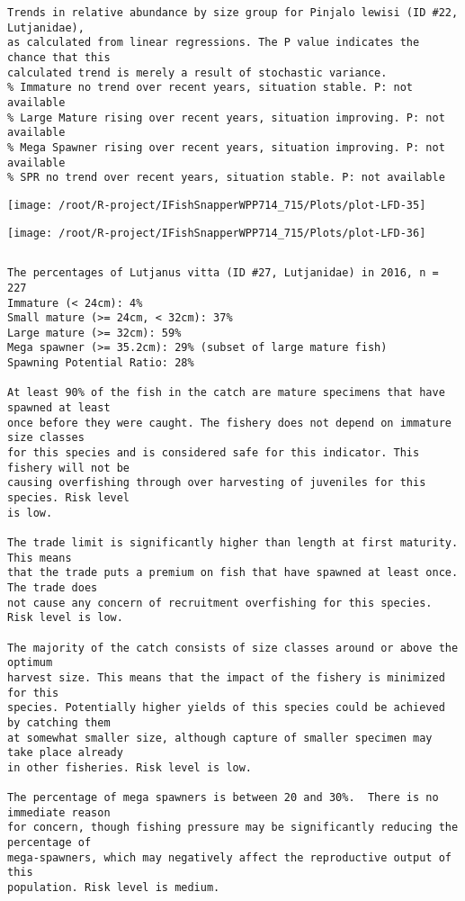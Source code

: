 \documentclass{report}\usepackage[]{graphicx}\usepackage[]{color}
\makeatletter
\def\maxwidth{ %
  \ifdim\Gin@nat@width>\linewidth
    \linewidth
  \else
    \Gin@nat@width
  \fi
}
\newenvironment{kframe}{%
 \def\at@end@of@kframe{}%
 \ifinner\ifhmode%
  \def\at@end@of@kframe{\end{minipage}}%
  \begin{minipage}{\columnwidth}%
 \fi\fi%
 \def\FrameCommand##1{\hskip\@totalleftmargin \hskip-\fboxsep
 \colorbox{shadecolor}{##1}\hskip-\fboxsep
     \hskip-\linewidth \hskip-\@totalleftmargin \hskip\columnwidth}%
 \MakeFramed {\advance\hsize-\width
   \@totalleftmargin\z@ \linewidth\hsize
   \@setminipage}}%
 {\par\unskip\endMakeFramed%
 \at@end@of@kframe}
\newenvironment{knitrout}{}{} %
\makeatother
\begin{document}
\begin{knitrout}
\begin{kframe}
\begin{verbatim}
Trends in relative abundance by size group for Pinjalo lewisi (ID #22, Lutjanidae),
as calculated from linear regressions. The P value indicates the chance that this
calculated trend is merely a result of stochastic variance.
% Immature no trend over recent years, situation stable. P: not available
% Large Mature rising over recent years, situation improving. P: not available
% Mega Spawner rising over recent years, situation improving. P: not available
% SPR no trend over recent years, situation stable. P: not available
\end{verbatim}
\end{kframe}
\texttt{[image: /root/R-project/IFishSnapperWPP714\_715/Plots/plot-LFD-35]} 

\texttt{[image: /root/R-project/IFishSnapperWPP714\_715/Plots/plot-LFD-36]} 
\begin{kframe}\begin{verbatim}
\end{verbatim}
\end{kframe}
\clearpage
\newpage
\begin{kframe}\begin{verbatim}The percentages of Lutjanus vitta (ID #27, Lutjanidae) in 2016, n = 227
Immature (< 24cm): 4%
Small mature (>= 24cm, < 32cm): 37%
Large mature (>= 32cm): 59%
Mega spawner (>= 35.2cm): 29% (subset of large mature fish)
Spawning Potential Ratio: 28%
 
At least 90% of the fish in the catch are mature specimens that have spawned at least
once before they were caught. The fishery does not depend on immature size classes
for this species and is considered safe for this indicator. This fishery will not be
causing overfishing through over harvesting of juveniles for this species. Risk level
is low.

The trade limit is significantly higher than length at first maturity.  This means
that the trade puts a premium on fish that have spawned at least once. The trade does
not cause any concern of recruitment overfishing for this species. Risk level is low.

The majority of the catch consists of size classes around or above the optimum
harvest size. This means that the impact of the fishery is minimized for this
species. Potentially higher yields of this species could be achieved by catching them
at somewhat smaller size, although capture of smaller specimen may take place already
in other fisheries. Risk level is low.

The percentage of mega spawners is between 20 and 30%.  There is no immediate reason
for concern, though fishing pressure may be significantly reducing the percentage of
mega-spawners, which may negatively affect the reproductive output of this
population. Risk level is medium.
 

\end{verbatim}
\end{kframe}
\end{knitrout}
\end{document}
